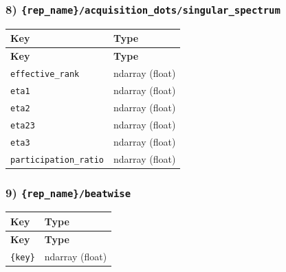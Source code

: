 \documentclass[11pt]{article}
\begin{document}
\subsubsection*{8) \texttt{\{rep\_\allowbreak{}name\}/\allowbreak{}acquisition\_\allowbreak{}dots/\allowbreak{}singular\_\allowbreak{}spectrum}}
\begin{longtable}{|p{}|p{}|}
\hline
\textbf{Key} & \textbf{Type} \\ \hline
\endfirsthead
\hline
\textbf{Key} & \textbf{Type} \\ \hline
\endhead
\texttt{effective\_\allowbreak{}rank} & ndarray (float) \\ \hline
\texttt{eta1} & ndarray (float) \\ \hline
\texttt{eta2} & ndarray (float) \\ \hline
\texttt{eta23} & ndarray (float) \\ \hline
\texttt{eta3} & ndarray (float) \\ \hline
\texttt{participation\_\allowbreak{}ratio} & ndarray (float) \\ \hline
\end{longtable}

\subsubsection*{9) \texttt{\{rep\_\allowbreak{}name\}/\allowbreak{}beatwise}}
\begin{longtable}{|p{}|p{}|}
\hline
\textbf{Key} & \textbf{Type} \\ \hline
\endfirsthead
\hline
\textbf{Key} & \textbf{Type} \\ \hline
\endhead
\texttt{\{key\}} & ndarray (float) \\ \hline
\end{longtable}
\end{document}
